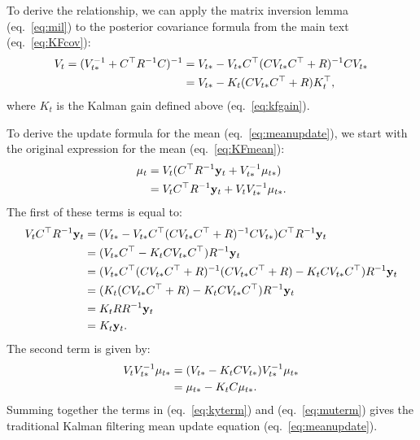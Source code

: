 \documentclass[10pt]{article}
\newcommand{\vy}{\mathbf{y}}
\begin{document}
\begin{appendices}
To derive the relationship, we can apply the matrix inversion lemma
 (eq.~\ref{eq:mil}) to the posterior covariance formula from the main text
 (eq.~\ref{eq:KFcov}):
\begin{align}
V_{t} = (V_{t*}^{-1} +  C^\top R^{-1} C)^{-1} 
&= V_{t*} - V_{t*}C^\top (C V_{t*} C^\top + R)^{-1} C V_{t*} \\
&= V_{t*} - K_{t}   (CV_{t*}C^\top + R) K_t^\top,
\end{align}
where $K_t$ is the Kalman gain defined above (eq.~\ref{eq:kfgain}).

To derive the update formula for the mean
(eq.~\ref{eq:meanupdate}), we start with the original expression for
the mean (eq.~\ref{eq:KFmean}):
\begin{alignat}{2}
  \mu_{t} &= V_{t}(C\trp R\inv \vy_{t} + V_{t*}\inv \mu_{t*}) \\
  &=V_{t}C\trp R\inv \vy_{t} + V_t V_{t*}\inv \mu_{t*}.
\end{alignat}
The first of these terms is equal to:
\begin{align}
  \label{eq:6}
  V_t C\trp R\inv \vy_t &=  (V_{t*} - V_{t*}C\trp (C V_{t*} C\trp +
                          R)\inv C V_{t*}) C\trp R\inv \vy_t \\
                        &=  (V_{t*}C\trp - K_t C V_{t*} C\trp) R\inv \vy_t \\
                        &=  (V_{t*}C\trp (C V_{t*} C\trp + R)\inv (C V_{t*} C\trp + R) - K_t C V_{t*} C\trp) R\inv \vy_t \\
                        &= (K_t (C V_{t*} C\trp + R) - K_t CV_{t*}C\trp) R\inv \vy_t \\
                        &= K_t R R\inv \vy_t \\
                        &= K_t \vy_t.                         \label{eq:kyterm}
\end{align}
The second term is given by:
\begin{alignat}{2}
  V_{t} V_{t*}^{-1} \mu_{t*}  &= (V_{t*} - K_{t}  C V_{t*}) V_{t*}^{-1}
  \mu_{t*} \\
  &= \mu_{t*} - K_t C \mu_{t*}. \label{eq:muterm}
\end{alignat}
Summing together the terms in (eq.~\ref{eq:kyterm}) and (eq.~\ref{eq:muterm})
gives the traditional Kalman filtering mean update equation (eq.~\ref{eq:meanupdate}).



\end{appendices}
\end{document}
